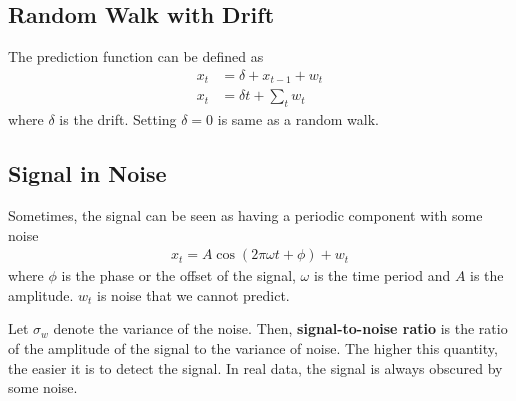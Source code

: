 \documentclass[../../time_series_notes.tex]{subfiles}
\begin{document}
\subsection{Random Walk with Drift}
The prediction function can be defined as
\begin{align*}
    x_{t} &= \delta + x_{t-1} + w_{t}\\
    x_{t} &= \delta t + \sum_{t} w_{t}
\end{align*}
where $\delta$ is the drift. Setting $\delta = 0$ is same as a random walk.

\subsection{Signal in Noise}
Sometimes, the signal can be seen as having a periodic component with some noise
\begin{align*}
    x_{t} = A\cos (2\pi \omega t + \phi) + w_{t}
\end{align*}
where $\phi$ is the phase or the offset of the signal, $\omega$ is the time period and $A$ is the amplitude. $w_{t}$ is noise that we cannot predict.\newline

Let $\sigma_{w}$ denote the variance of the noise. Then, \textbf{signal-to-noise ratio} is the ratio of the amplitude of the signal to the variance of noise. The higher this quantity, the easier it is to detect the signal. In real data, the signal is always obscured by some noise.
\end{document}
